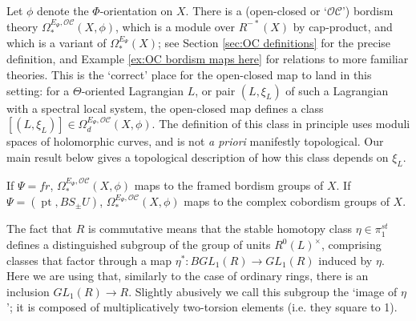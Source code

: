 \documentclass{TPmod}
\newcommand{\pt}{\operatorname{pt}}
\newcommand{\cC}{\mathcal{C}}
\newcommand{\cO}{\mathcal{O}}
\numberwithin{equation}{section}
\begin{document}
Let $\phi$ denote the $\Phi$-orientation on $X$. There is a (open-closed or `$\cO\cC$') bordism theory $\Omega_*^{E_{\Psi},\cO\cC}(X,\phi)$, which is a module over $R^{-*}(X)$  by cap-product, and which is a variant of $\Omega_*^{E_{\Psi}}(X)$; see Section \ref{sec:OC definitions} for the precise definition, and Example \ref{ex:OC bordism maps here} for relations to more familiar theories. This is 
the `correct' place for the open-closed map to land in this setting: for a $\Theta$-oriented Lagrangian $L$, or pair $(L,\xi_L)$ of such a Lagrangian with a spectral local system, the open-closed map defines a class $[(L,\xi_L)] \in \Omega_d^{E_{\Psi},\cO\cC}(X,\phi)$. The definition of this class in principle uses moduli spaces of holomorphic curves, and is not \emph{a priori} manifestly topological. Our main result below gives a topological description of how this class depends on $\xi_L$.

\begin{ex}
    If $\Psi=fr$, $\Omega^{E_\Psi, \cO\cC}_*(X, \phi)$ maps to the framed bordism groups of $X$. If $\Psi = (\pt, BS_\pm U)$, $\Omega^{E_\Psi,\cO\cC}_*(X,\phi)$ maps to the complex cobordism groups of $X$.
\end{ex}







The fact that $R$ is commutative means that the stable homotopy class $\eta \in \pi_1^{st}$ defines  a distinguished subgroup of the group of units $R^0(L)^\times$, comprising classes that factor through a map $\eta^*: BGL_1(R) \to GL_1(R)$ induced by $\eta$. Here we are using that, similarly to the case of ordinary rings, there is an inclusion $GL_1(R) \to R$. Slightly abusively we call this subgroup the `image of $\eta$'; it is composed of multiplicatively two-torsion elements (i.e. they square to 1). 
\end{document}
